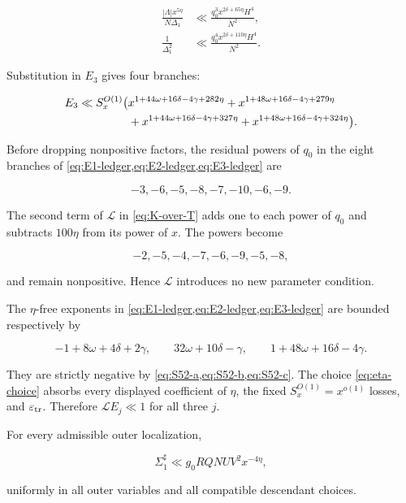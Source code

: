 \begin{align}
 \frac{|\Lambda|x^{5\eta}}{N\Delta_1}
 &\ll\frac{q_0^3x^{2\delta+65\eta}H^4}{N^2},
 \label{eq:branch-Lambda}\\
 \frac1{\Delta_1^2}
 &\ll\frac{q_0^4x^{2\delta+110\eta}H^4}{N^2}.
 \label{eq:branch-Delta}
\end{align}

Substitution in $E_3$ gives four branches:

\begin{align}
 E_3\ll S_x^{O(1)}\bigl(&
 x^{1+44\omega+16\delta-4\gamma+282\eta}
 +x^{1+48\omega+16\delta-4\gamma+279\eta}\notag\\
 &+x^{1+44\omega+16\delta-4\gamma+327\eta}
 +x^{1+48\omega+16\delta-4\gamma+324\eta}
 \bigr).
 \label{eq:E3-ledger}
\end{align}

Before dropping nonpositive factors, the residual powers of $q_0$ in the
eight branches of \cref{eq:E1-ledger,eq:E2-ledger,eq:E3-ledger} are

\begin{equation}\label{eq:q0-ledger}
 -3,-6,-5,-8,-7,-10,-6,-9.
\end{equation}

The second term of $\mathcal L$ in \cref{eq:K-over-T} adds one to each
power of $q_0$ and subtracts $100\eta$ from its power of $x$.  The powers
become

\[
 -2,-5,-4,-7,-6,-9,-5,-8,
\]

and remain nonpositive.  Hence $\mathcal L$ introduces no new parameter
condition.

The $\eta$-free exponents in \cref{eq:E1-ledger,eq:E2-ledger,eq:E3-ledger}
are bounded respectively by

\begin{equation}\label{eq:three-margins}
 -1+8\omega+4\delta+2\gamma,\qquad
 32\omega+10\delta-\gamma,\qquad
 1+48\omega+16\delta-4\gamma.
\end{equation}

They are strictly negative by
\cref{eq:S52-a,eq:S52-b,eq:S52-c}.  The choice
\cref{eq:eta-choice} absorbs every displayed coefficient of $\eta$, the
fixed $S_x^{O(1)}=x^{o(1)}$ losses, and $\varepsilon_{\rm tr}$.  Therefore
$\mathcal LE_j\ll1$ for all three $j$.

\begin{proposition}
\label{prop:duplicated-S52}
For every admissible outer localization,

\begin{equation}\label{eq:duplicated-conclusion}
 \Sigma_1^\sharp\ll g_0RQNUV^2x^{-4\eta},
\end{equation}

uniformly in all outer variables and all compatible descendant choices.
\end{proposition}

